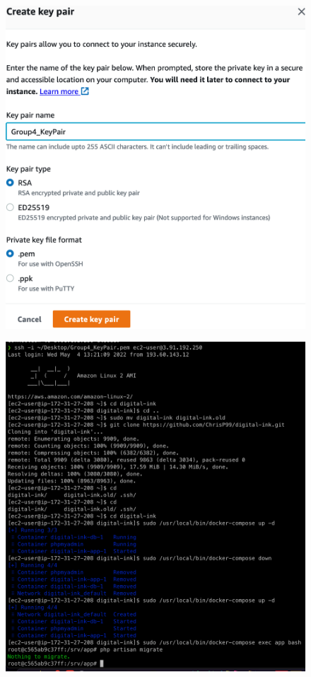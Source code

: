 \begin{figure}[!htbp]
    \centering
    \begin{minipage}{.5\textwidth}
        \centering
        \includegraphics[width=1\linewidth]{resources/ec2/create-key-pair-2}
        \label{fig:create-keypair-pem}
    \end{minipage}%
    \begin{minipage}{.5\textwidth}
        \centering
        \includegraphics[width=1\linewidth]{resources/log-in-with-key-pair-2}

\end{minipage}
\end{figure}
